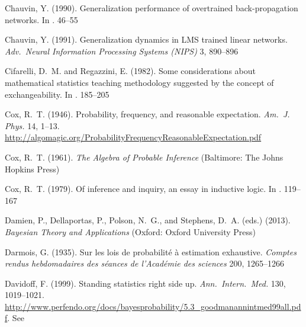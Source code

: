 \documentclass[%
]{frontiersSCNS-nologo} %
\newcommand*{\langfrench}{\foreignlanguage{french}}
\newcommand*{\citein}[2][]{\textnormal{\citet[#1]{#2}}%
}
\newcommand*{\citebi}[2][]{\citet[#1]{#2}%
}
\renewcommand*{\|}{\mathpunct{|}}%
\begin{document}
\begin{thebibliography}{156}
Chauvin, Y. (1990).
\newblock Generalization performance of overtrained back-propagation networks.
\newblock In \emph{\citein{almeidaetal1990}}. 46--55

Chauvin, Y. (1991).
\newblock Generalization dynamics in {LMS} trained linear networks.
\newblock \emph{Adv.\ Neural Information Processing Systems (NIPS)} 3, 890--896

Cifarelli, D.~M. and Regazzini, E. (1982).
\newblock Some considerations about mathematical statistics teaching
  methodology suggested by the concept of exchangeability.
\newblock In \emph{\citein{kochetal1982}}. 185--205

Cox, R.~T. (1946).
\newblock Probability, frequency, and reasonable expectation.
\newblock \emph{Am.\ J. Phys.} 14, 1--13.
\newblock
  \url{http://algomagic.org/ProbabilityFrequencyReasonableExpectation.pdf}

Cox, R.~T. (1961).
\newblock \emph{The Algebra of Probable Inference} (Baltimore: The Johns
  Hopkins Press)

Cox, R.~T. (1979).
\newblock Of inference and inquiry, an essay in inductive logic.
\newblock In \emph{\citein{levineetal1979}}. 119--167

Damien, P., Dellaportas, P., Polson, N.~G., and Stephens, D.~A. (eds.) (2013).
\newblock \emph{Bayesian Theory and Applications} (Oxford: Oxford University
  Press)

Darmois, G. (1935).
\newblock \langfrench{{Sur} les lois de probabilit{\'e} {\`a} estimation
  exhaustive}.
\newblock \emph{\langfrench{Comptes rendus hebdomadaires des s{\'e}ances de
  l'Acad{\'e}mie des sciences}} 200, 1265--1266

Davidoff, F. (1999).
\newblock Standing statistics right side up.
\newblock \emph{Ann.\ Intern.\ Med.} 130, 1019--1021.
\newblock
  \url{http://www.perfendo.org/docs/bayesprobability/5.3_goodmanannintmed99all.pdf}.
  See \citebi{goodman1999,sulmasyetal2000}


\end{thebibliography}
\end{document}
